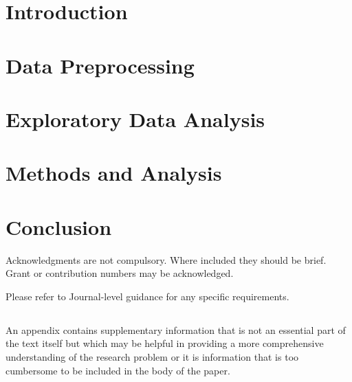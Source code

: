 \documentclass[sn-basic,pdflatex]{sn-jnl}
\theoremstyle{remark}
\theoremstyle{definition}
\begin{document}
\keywords{}



\maketitle

\hypertarget{sec1}{%
\section{Introduction}\label{sec1}}

\hypertarget{sec2}{%
\section{Data Preprocessing}\label{sec2}}

\hypertarget{sec3}{%
\section{Exploratory Data Analysis}\label{sec3}}

\hypertarget{sec4}{%
\section{Methods and Analysis}\label{sec4}}

\hypertarget{sec5}{%
\section{Conclusion}\label{sec5}}


Acknowledgments are not compulsory. Where included they should be brief.
Grant or contribution numbers may be acknowledged.

Please refer to Journal-level guidance for any specific requirements.

\begin{appendices}

\hypertarget{secA}{%
\section{}\label{secA}}

An appendix contains supplementary information that is not an essential
part of the text itself but which may be helpful in providing a more
comprehensive understanding of the research problem or it is information
that is too cumbersome to be included in the body of the paper.

\end{appendices}


\end{document}
